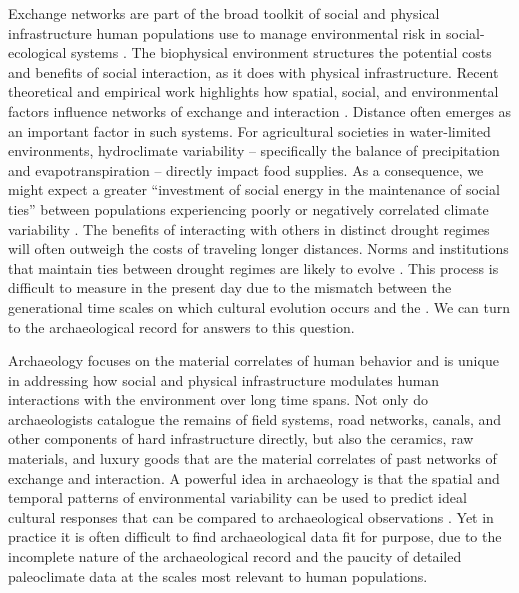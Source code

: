 \documentclass[10pt]{iopart}
\begin{document}
Exchange networks are part of the broad toolkit of social and physical infrastructure human populations use to manage environmental risk in social-ecological systems \parencite{Anderies2015}. The biophysical environment structures the potential costs and benefits of social interaction, as it does with physical infrastructure. Recent theoretical and empirical work highlights how spatial, social, and environmental factors influence networks of exchange and interaction \parencite{Fafchamps2007,Bloch2008,Nolin2010,Verdery2012,Freeman2014,Koster2014,Hao2015a,Schnegg2015}. Distance often emerges as an important factor in such systems. For agricultural societies in water-limited environments, hydroclimate variability -- specifically the balance of precipitation and evapotranspiration -- directly impact food supplies. As a consequence, we might expect a greater ``investment of social energy in the maintenance of social ties'' between populations experiencing poorly or negatively correlated climate variability \parencite{Rautman1993a}. The benefits of interacting with others in distinct drought regimes will often outweigh the costs of traveling longer distances. Norms and institutions that maintain ties between drought regimes are likely to evolve \parencite{Durante2009}. This process is difficult to measure in the present day due to the mismatch between the generational time scales on which cultural evolution occurs and the . We can turn to the archaeological record for answers to this question. 

Archaeology focuses on the material correlates of human behavior and is unique in addressing how social and physical infrastructure modulates human interactions with the environment over long time spans. Not only do archaeologists catalogue the remains of field systems, road networks, canals, and other components of hard infrastructure directly, but also the ceramics, raw materials, and luxury goods that are the material correlates of past networks of exchange and interaction. A powerful idea in archaeology is that the spatial and temporal patterns of environmental variability can be used to predict ideal cultural responses that can be compared to archaeological observations \parencite{Halstead1989}. Yet in practice it is often difficult to find archaeological data fit for purpose, due to the incomplete nature of the archaeological record and the paucity of detailed paleoclimate data at the scales most relevant to human populations. 
\end{document}
